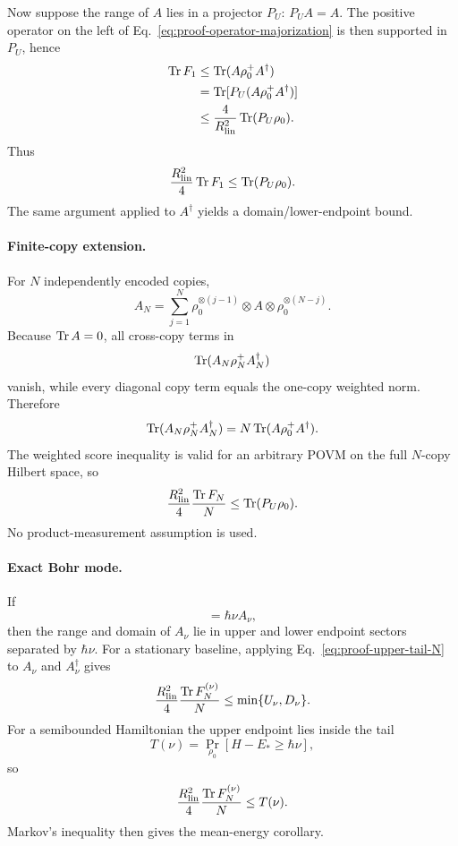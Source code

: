 Now suppose the range of $A$ lies in a projector $P_U$: $P_UA=A$. The positive operator on the left of Eq.~\eqref{eq:proof-operator-majorization} is then supported in $P_U$, hence
\begin{align}
\operatorname{Tr} F_1
&\le\operatorname{Tr}(A\rho_0^+A^\dagger)\\
&=\operatorname{Tr}[P_U(A\rho_0^+A^\dagger)]\\
&\le\frac4{R_{\rm lin}^2}\operatorname{Tr}(P_U\rho_0).
\end{align}
Thus
\begin{equation}
\frac{R_{\rm lin}^2}{4}\operatorname{Tr} F_1
\le\operatorname{Tr}(P_U\rho_0).
\label{eq:proof-upper-tail}
\end{equation}
The same argument applied to $A^\dagger$ yields a domain/lower-endpoint bound.

\paragraph{Finite-copy extension.}
For $N$ independently encoded copies,
\begin{equation}
A_N=\sum_{j=1}^N
\rho_0^{\otimes(j-1)}\otimes A\otimes
\rho_0^{\otimes(N-j)}.
\end{equation}
Because $\operatorname{Tr} A=0$, all cross-copy terms in
\begin{equation}
\operatorname{Tr}(A_N\rho_N^+A_N^\dagger)
\end{equation}
vanish, while every diagonal copy term equals the one-copy weighted norm. Therefore
\begin{equation}
\operatorname{Tr}(A_N\rho_N^+A_N^\dagger)
=N\operatorname{Tr}(A\rho_0^+A^\dagger).
\end{equation}
The weighted score inequality is valid for an arbitrary POVM on the full $N$-copy Hilbert space, so
\begin{equation}
\frac{R_{\rm lin}^2}{4}\frac{\operatorname{Tr} F_N}{N}
\le\operatorname{Tr}(P_U\rho_0).
\label{eq:proof-upper-tail-N}
\end{equation}
No product-measurement assumption is used.

\paragraph{Exact Bohr mode.}
If
\begin{equation}
[H,A_\nu]=\hbar\nu A_\nu,
\end{equation}
then the range and domain of $A_\nu$ lie in upper and lower endpoint sectors separated by $\hbar\nu$. For a stationary baseline, applying Eq.~\eqref{eq:proof-upper-tail-N} to $A_\nu$ and $A_\nu^\dagger$ gives
\begin{equation}
\frac{R_{\rm lin}^2}{4}\frac{\operatorname{Tr} F_N^{(\nu)}}{N}
\le\min\{U_\nu,D_\nu\}.
\end{equation}
For a semibounded Hamiltonian the upper endpoint lies inside the tail
\begin{equation}
T(\nu)=\Pr_{\rho_0}[H-E_*\ge\hbar\nu],
\end{equation}
so
\begin{equation}
\frac{R_{\rm lin}^2}{4}\frac{\operatorname{Tr} F_N^{(\nu)}}{N}
\le T(\nu).
\end{equation}
Markov's inequality then gives the mean-energy corollary.

